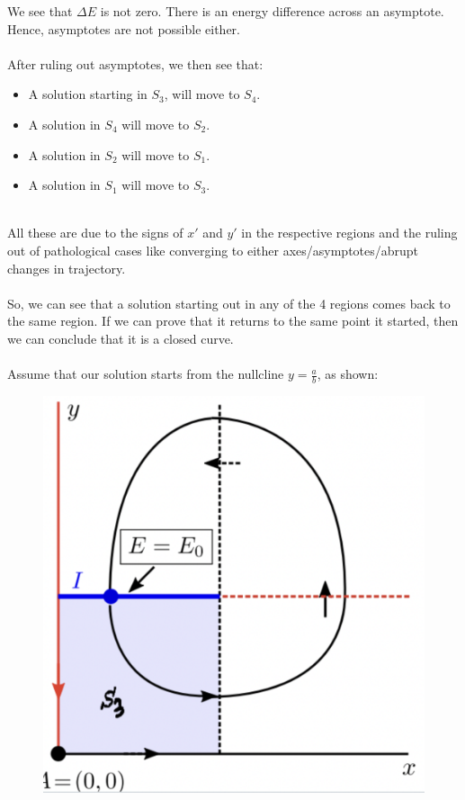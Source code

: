 \documentclass{article}
\begin{document}
We see that $\Delta E$ is not zero. There is an energy difference across an asymptote. Hence, asymptotes are not possible either.
\\
\\
After ruling out asymptotes, we then see that:
\begin{itemize}
    \item A solution starting in $S_3$, will move to $S_4$.
    \item A solution in $S_4$ will move to $S_2$.
    \item A solution in $S_2$ will move to $S_1$.
    \item A solution in $S_1$ will move to $S_3$.
\end{itemize}
\\
All these are due to the signs of $x'$ and $y'$ in the respective regions and the ruling out of pathological cases like converging to either axes/asymptotes/abrupt changes in trajectory.
\\
\\
So, we can see that a solution starting out in any of the 4 regions comes back to the same region. If we can prove that it returns to the same point it started, then we can conclude that it is a closed curve. 
\\
\\
Assume that our solution starts from the nullcline $y = \frac{a}{b}$, as shown:
\begin{figure}[h]
    \centering
    \includegraphics[scale = 0.3]{closedness.png}
    \caption{}
    \label{fig:my_label}
\end{figure}
\end{document}
